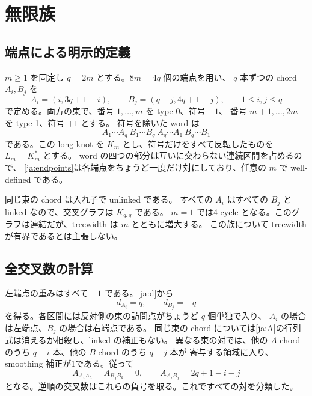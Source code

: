 \documentclass[12pt]{amsart}
\theoremstyle{definition}
\theoremstyle{remark}
\numberwithin{equation}{section}
\begin{document}
\section{無限族}
\subsection{端点による明示的定義}
$m\ge1$ を固定し $q=2m$ とする。$8m=4q$ 個の端点を用い、
$q$ 本ずつの chord $A_i,B_j$ を
\begin{equation}\label{ja:endpoints}
A_i=(i,3q+1-i),\qquad B_j=(q+j,4q+1-j),\qquad1\le i,j\le q
\end{equation}
で定める。両方の束で、番号 $1,\ldots,m$ を type 0、符号 $-1$、
番号 $m+1,\ldots,2m$ を type 1、符号 $+1$ とする。
符号を除いた word は
\begin{equation}\label{ja:word}
A_1\cdots A_q\ B_1\cdots B_q\ A_q\cdots A_1\ B_q\cdots B_1
\end{equation}
である。この long knot を $K_m$ とし、符号だけをすべて反転したものを
$L_m=K_m^*$ とする。
word の四つの部分は互いに交わらない連続区間を占めるので、
\eqref{ja:endpoints}は各端点をちょうど一度だけ対にしており、任意の $m$ で well-defined である。

同じ束の chord は入れ子で unlinked である。
すべての $A_i$ はすべての $B_j$ と linked なので、交叉グラフは $K_{q,q}$ である。
$m=1$ では4-cycle となる。このグラフは連結だが、treewidth は $m$ とともに増大する。
この族について treewidth が有界であるとは主張しない。

\subsection{全交叉数の計算}
左端点の重みはすべて $+1$ である。\eqref{ja:d}から
\begin{equation}\label{ja:familyd}
d_{A_i}=q,\qquad d_{B_j}=-q
\end{equation}
を得る。各区間には反対側の束の訪問点がちょうど $q$ 個単独で入り、
$A_i$ の場合は左端点、$B_j$ の場合は右端点である。
同じ束の chord については\eqref{ja:A}の行列式は消えるか相殺し、linked の補正もない。
異なる束の対では、他の $A$ chord のうち $q-i$ 本、他の $B$ chord のうち $q-j$ 本が
寄与する領域に入り、smoothing 補正が1である。従って
\begin{equation}\label{ja:familyA}
A_{A_iA_h}=A_{B_jB_k}=0,\qquad A_{A_iB_j}=2q+1-i-j
\end{equation}
となる。逆順の交叉数はこれらの負号を取る。これですべての対を分類した。
\end{document}
